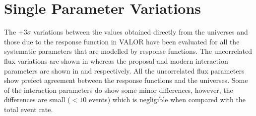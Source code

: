 
\chapter{Single Parameter Variations}\label{app:single_parameter_variations}

The $+3\sigma$ variations between the values obtained directly from the universes and those due to the response function in VALOR have been evaluated for all the systematic parameters that are modelled by response functions. The uncorrelated flux variations are shown in  whereas the proposal and modern interaction parameters are shown in  and  respectively. All the uncorrelated flux parameters show prefect agreement between the response functions and the universes. Some of the interaction parameters do show some minor differences, however, the differences are small ($<10$ events) which is negligible when compared with the total event rate. 

\def\proposalxsec{
genie_ccresAxial_Genie,genie_ncresAxial_Genie,genie_qema_Genie,genie_NC_Genie,genie_NonResRvpCC1pi_Genie,genie_NonResRvnCC1pi_Genie,genie_NonResRvbarnCC1pi_Genie,genie_NonResRvbarpCC1pi_Genie,genie_NonResRvpCC2pi_Genie,genie_NonResRvnCC2pi_Genie,genie_NonResRvbarnCC2pi_Genie,genie_NonResRvbarpCC2pi_Genie,genie_NonResRvpNC1pi_Genie,genie_NonResRvnNC1pi_Genie,genie_NonResRvbarnNC1pi_Genie,genie_NonResRvbarpNC1pi_Genie,genie_NonResRvpNC2pi_Genie,genie_NonResRvnNC2pi_Genie,genie_NonResRvbarnNC2pi_Genie,genie_NonResRvbarpNC2pi_Genie}

\def\modernxsec {genie_DISAth_Genie,genie_DISBth_Genie,genie_DISCv1u_Genie,genie_DISCv2u_Genie,genie_IntraNukeNabs_Genie,genie_IntraNukeNcex_Genie,genie_IntraNukeNinel_Genie,genie_IntraNukeNmfp_Genie,genie_IntraNukeNpi_Genie,genie_IntraNukePIabs_Genie,genie_IntraNukePIcex_Genie,genie_IntraNukePIinel_Genie,genie_IntraNukePImfp_Genie,genie_IntraNukePIpi_Genie,genie_ResDecayGamma_Genie,genie_ccresVector_Genie,genie_cohMA_Genie,genie_cohR0_Genie,genie_ncelAxial_Genie,genie_ncelEta_Genie,genie_ncresVector_Genie}


